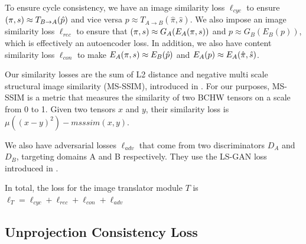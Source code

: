 \documentclass{article}
\begin{document}

To ensure cycle consistency, we have an image similarity loss $\ell_{cyc}$ to ensure
$(\pi,s) \approx T_{B\rightarrow A}(\hat{p})$
and vice versa
$p \approx T_{A\rightarrow B}(\hat{\pi},\hat{s})$.
We also impose an image similarity loss $\ell_{rec}$ to ensure that $(\pi,s) \approx G_A(E_A(\pi,s))$ and $p \approx G_B(E_B(p))$, which is effectively an autoencoder loss. 
In addition, we also have content similarity loss $ \ell_{con}$ to make 
$E_A(\pi,s) \approx E_B(\hat{p})$ and $E_A(p) \approx E_A(\hat{\pi},\hat{s})$.

Our similarity losses are the sum of L2 distance and negative multi scale structural image similarity (MS-SSIM), introduced in \citep{msssim}. For our purposes, MS-SSIM is a metric that measures the similarity of two BCHW tensors on a scale from 0 to 1. Given two tensors $x$ and $y$, their similarity loss is $\mu\left((x-y)^2\right) - msssim(x,y)$. 

We also have adversarial losses $\ell_{adv}$ that come from two discriminators $D_A$ and $D_B$, targeting domains A and B respectively. They use the LS-GAN loss introduced in \citep{lsgan}.

In total, the loss for the image translator module $T$ is $\ell_T=\ell_{cyc}+\ell_{rec}+\ell_{con}+\ell_{adv}$










\subsection{Unprojection Consistency Loss}
\end{document}
